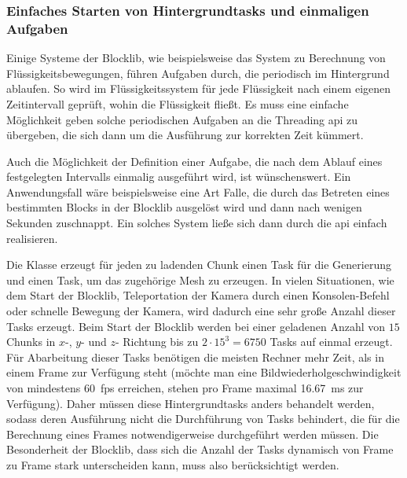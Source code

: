 \subsubsection{Einfaches Starten von Hintergrundtasks und einmaligen Aufgaben}\label{sec:reqBackgroundTasks}
Einige Systeme der Blocklib, wie beispielsweise das System zu Berechnung von Flüssigkeitsbewegungen, führen Aufgaben durch, die periodisch im Hintergrund ablaufen. So wird im Flüssigkeitssystem für jede Flüssigkeit nach einem eigenen Zeitintervall geprüft, wohin die Flüssigkeit fließt. Es muss eine einfache Möglichkeit geben solche periodischen Aufgaben an die Threading \acs{api} zu übergeben, die sich dann um die Ausführung zur korrekten Zeit kümmert.

Auch die Möglichkeit der Definition einer Aufgabe, die nach dem Ablauf eines festgelegten Intervalls einmalig ausgeführt wird, ist wünschenswert. Ein Anwendungsfall wäre beispielsweise eine Art Falle, die durch das Betreten eines bestimmten Blocks in der Blocklib ausgelöst wird und dann nach wenigen Sekunden zuschnappt. Ein solches System ließe sich dann durch die \acs{api} einfach realisieren.

Die Klasse \classChunkStorage{} erzeugt für jeden zu ladenden Chunk einen Task für die Generierung und einen Task, um das zugehörige Mesh zu erzeugen. In vielen Situationen, wie dem Start der Blocklib, Teleportation der Kamera durch einen Konsolen-Befehl oder schnelle Bewegung der Kamera, wird dadurch eine sehr große Anzahl dieser Tasks erzeugt. Beim Start der Blocklib werden bei einer geladenen Anzahl von $15$ Chunks in  $x$-, $y$- und $z$- Richtung bis zu $2\cdot15^3=6750$  Tasks auf einmal erzeugt. Für Abarbeitung dieser Tasks benötigen die meisten Rechner mehr Zeit, als in einem Frame zur Verfügung steht (möchte man eine Bildwiederholgeschwindigkeit von mindestens 60~\ac{fps} erreichen, stehen pro Frame maximal \SI{16,67}{\milli\second} zur Verfügung). Daher müssen diese Hintergrundtasks anders behandelt werden, sodass deren Ausführung nicht die Durchführung von Tasks behindert, die für die Berechnung eines Frames notwendigerweise durchgeführt werden müssen. Die Besonderheit der Blocklib, dass sich die Anzahl der Tasks  dynamisch von Frame zu Frame stark unterscheiden kann, muss also berücksichtigt werden.